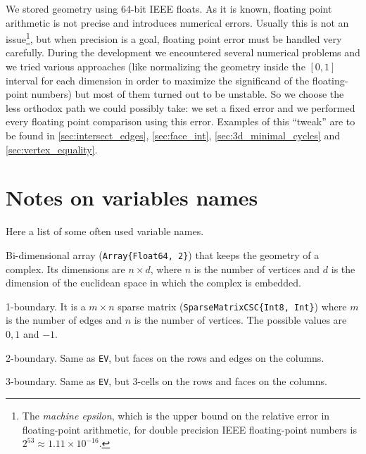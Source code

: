 We stored geometry using 64-bit IEEE floats.
As it is known, floating point arithmetic is not
precise and introduces numerical errors.
Usually this is not an issue\footnote{The \textit{machine epsilon},
which is the upper bound on the relative error in floating-point 
arithmetic, for double precision IEEE floating-point numbers is 
$2^53 \approx 1.11 \times 10^{-16}$.}, but when precision is
a goal, floating point error must be handled very carefully.
During the development we encountered several numerical problems
and we tried various approaches (like normalizing the geometry
inside the $[0, 1]$ interval for each dimension in order to maximize
the significand of the floating-point numbers) but most of them turned 
out to be unstable. So we choose the less orthodox path we could
possibly take: we set a fixed error and we performed every floating point
comparison using this error. Examples of this ``tweak'' are to be found in
\ref{sec:intersect_edges}, \ref{sec:face_int}, \ref{sec:3d_minimal_cycles} and 
\ref{sec:vertex_equality}.

\section{Notes on variables names}

Here a list of some often used variable names.

\begin{description}[align=right,labelwidth=2em]
    \item [\texttt{V}:]
        Bi-dimensional array (\texttt{Array\{Float64, 2\}}) that keeps the geometry of a complex.
        Its dimensions are $n \times d$, where $n$ is the number of vertices and $d$ is the dimension
        of the euclidean space in which the complex is embedded.
    \item [\texttt{EV}:]
        1-boundary. It is a $m \times n$ sparse matrix (\texttt{SparseMatrixCSC\{Int8, Int\}}) 
        where $m$ is the number of edges and $n$ is the number of vertices. The possible values
        are $0, 1$ and $-1$.
    \item [\texttt{FE}:]
        2-boundary. Same as \texttt{EV}, but faces on the rows and edges on the columns.
    \item [\texttt{CF}:]
        3-boundary. Same as \texttt{EV}, but 3-cells on the rows and faces on the columns.
    

\end{description}